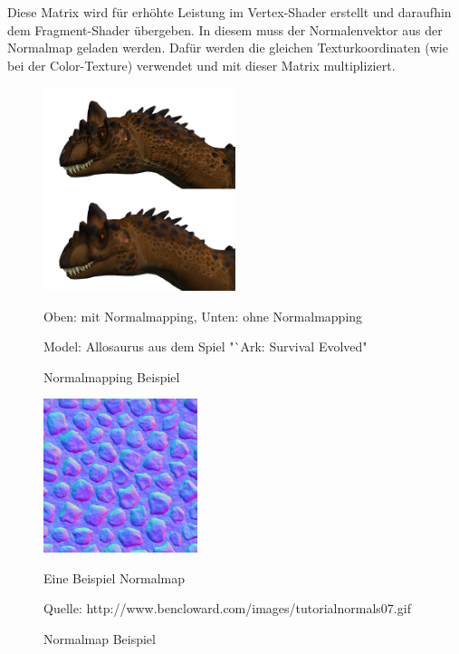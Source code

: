Diese Matrix wird für erhöhte Leistung im Vertex-Shader erstellt und daraufhin dem Fragment-Shader übergeben. In diesem muss der Normalenvektor aus der Normalmap geladen werden. Dafür werden die gleichen Texturkoordinaten (wie bei der Color-Texture) verwendet und mit dieser Matrix multipliziert.

\begin{figure}
	\begin{center}
		\includegraphics[width=0.5\textwidth]{02theorie/Normalmapping.png}
		
		Oben: mit Normalmapping, Unten: ohne Normalmapping
		
		Model: Allosaurus aus dem Spiel "`Ark: Survival Evolved"
		
		\caption{Normalmapping Beispiel}
		\label{img:Normalmapping}
	\end{center}
\end{figure}
\begin{figure}
	\begin{center}
		\includegraphics[width=0.4\textwidth]{02theorie/normalmap.png}
		
		Eine Beispiel Normalmap
		
		Quelle: http://www.bencloward.com/images/tutorial\textunderscore normals07.gif
		
		\caption{Normalmap Beispiel}
		\label{img:Normalmap}
	\end{center}
\end{figure}